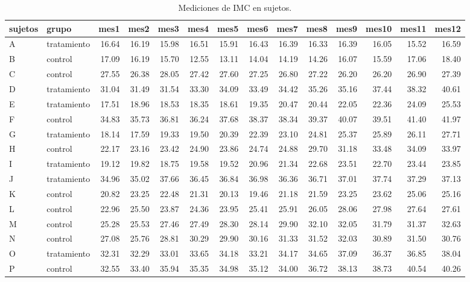 \documentclass[]{article}
\begin{document}
\begin{table}[ht]
\centering
\begingroup\tiny
\begin{tabular}{llrrrrrrrrrrrr}
  \hline
sujetos & grupo & mes1 & mes2 & mes3 & mes4 & mes5 & mes6 & mes7 & mes8 & mes9 & mes10 & mes11 & mes12 \\ 
  \hline
A & tratamiento & 16.64 & 16.19 & 15.98 & 16.51 & 15.91 & 16.43 & 16.39 & 16.33 & 16.39 & 16.05 & 15.52 & 16.59 \\ 
  B & control & 17.09 & 16.19 & 15.70 & 12.55 & 13.11 & 14.04 & 14.19 & 14.26 & 16.07 & 15.59 & 17.06 & 18.40 \\ 
  C & control & 27.55 & 26.38 & 28.05 & 27.42 & 27.60 & 27.25 & 26.80 & 27.22 & 26.20 & 26.20 & 26.90 & 27.39 \\ 
  D & tratamiento & 31.04 & 31.49 & 31.54 & 33.30 & 34.09 & 33.49 & 34.42 & 35.26 & 35.16 & 37.44 & 38.32 & 40.61 \\ 
  E & tratamiento & 17.51 & 18.96 & 18.53 & 18.35 & 18.61 & 19.35 & 20.47 & 20.44 & 22.05 & 22.36 & 24.09 & 25.53 \\ 
  F & control & 34.83 & 35.73 & 36.81 & 36.24 & 37.68 & 38.37 & 38.34 & 39.37 & 40.07 & 39.51 & 41.40 & 41.97 \\ 
  G & tratamiento & 18.14 & 17.59 & 19.33 & 19.50 & 20.39 & 22.39 & 23.10 & 24.81 & 25.37 & 25.89 & 26.11 & 27.71 \\ 
  H & control & 22.17 & 23.16 & 23.42 & 24.90 & 23.86 & 24.74 & 24.88 & 29.70 & 31.18 & 33.48 & 34.09 & 33.97 \\ 
  I & tratamiento & 19.12 & 19.82 & 18.75 & 19.58 & 19.52 & 20.96 & 21.34 & 22.68 & 23.51 & 22.70 & 23.44 & 23.85 \\ 
  J & tratamiento & 34.96 & 35.02 & 37.66 & 36.45 & 36.84 & 36.98 & 36.36 & 36.71 & 37.01 & 37.74 & 37.29 & 37.13 \\ 
  K & control & 20.82 & 23.25 & 22.48 & 21.31 & 20.13 & 19.46 & 21.18 & 21.59 & 23.25 & 23.62 & 25.06 & 25.16 \\ 
  L & control & 22.96 & 25.50 & 23.87 & 24.36 & 23.95 & 25.41 & 25.91 & 26.05 & 28.06 & 27.98 & 27.64 & 27.61 \\ 
  M & control & 25.28 & 25.53 & 27.46 & 27.49 & 28.30 & 28.14 & 29.90 & 32.10 & 32.05 & 31.79 & 31.37 & 32.63 \\ 
  N & control & 27.08 & 25.76 & 28.81 & 30.29 & 29.90 & 30.16 & 31.33 & 31.52 & 32.03 & 30.89 & 31.50 & 30.76 \\ 
  O & tratamiento & 32.31 & 32.29 & 33.01 & 33.65 & 34.18 & 33.21 & 34.17 & 34.65 & 37.09 & 36.37 & 36.85 & 38.04 \\ 
  P & control & 32.55 & 33.40 & 35.94 & 35.35 & 34.98 & 35.12 & 34.00 & 36.72 & 38.13 & 38.73 & 40.54 & 40.26 \\ 
   \hline
\end{tabular}
\endgroup
\caption{Mediciones de IMC en sujetos.} 
\label{tab:sujetos}
\end{table}
\end{document}
